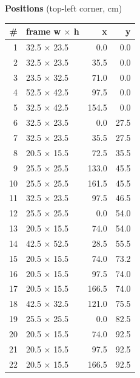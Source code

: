 \documentclass[a4paper,landscape,10pt]{article}
\begin{document}
\begin{minipage}[t]{0.25\textwidth}
\vspace{8pt}
{\bfseries Positions} (top-left corner, cm)\\[2pt]
\tiny
\begin{tabular}{@{}r l r r@{}}
\toprule
\# & frame w $\times$ h & x & y \\
\midrule
1 & 32.5 $\times$ 23.5 & 0.0 & 0.0 \\
2 & 32.5 $\times$ 23.5 & 35.5 & 0.0 \\
3 & 23.5 $\times$ 32.5 & 71.0 & 0.0 \\
4 & 52.5 $\times$ 42.5 & 97.5 & 0.0 \\
5 & 32.5 $\times$ 42.5 & 154.5 & 0.0 \\
6 & 32.5 $\times$ 23.5 & 0.0 & 27.5 \\
7 & 32.5 $\times$ 23.5 & 35.5 & 27.5 \\
8 & 20.5 $\times$ 15.5 & 72.5 & 35.5 \\
9 & 25.5 $\times$ 25.5 & 133.0 & 45.5 \\
10 & 25.5 $\times$ 25.5 & 161.5 & 45.5 \\
11 & 32.5 $\times$ 23.5 & 97.5 & 46.5 \\
12 & 25.5 $\times$ 25.5 & 0.0 & 54.0 \\
13 & 20.5 $\times$ 15.5 & 74.0 & 54.0 \\
14 & 42.5 $\times$ 52.5 & 28.5 & 55.5 \\
15 & 20.5 $\times$ 15.5 & 74.0 & 73.2 \\
16 & 20.5 $\times$ 15.5 & 97.5 & 74.0 \\
17 & 20.5 $\times$ 15.5 & 166.5 & 74.0 \\
18 & 42.5 $\times$ 32.5 & 121.0 & 75.5 \\
19 & 25.5 $\times$ 25.5 & 0.0 & 82.5 \\
20 & 20.5 $\times$ 15.5 & 74.0 & 92.5 \\
21 & 20.5 $\times$ 15.5 & 97.5 & 92.5 \\
22 & 20.5 $\times$ 15.5 & 166.5 & 92.5 \\
\bottomrule
\end{tabular}
\end{minipage}
\clearpage
\end{document}
